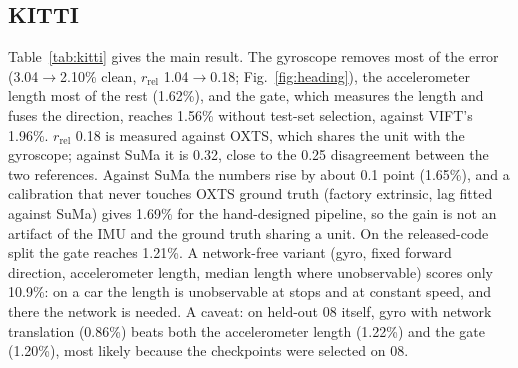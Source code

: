 \documentclass[letterpaper,journal]{IEEEtran}
\begin{document}
\subsection{KITTI}

\begin{table}[t]
\caption{KITTI 05/07/10, $t_\mathrm{rel}$\,\% (mean $\pm$ sd over 3 seeds) / $r_\mathrm{rel}$. Clean: paper-text split, checkpoint selected on held-out 08. With 08: checkpoint selected on the test drives, as in VIFT's code. SuMa: lidar-SLAM reference independent of the IMU; against SuMa, $r_\mathrm{rel}$ is 0.32 for every row with gyro rotation.}
\label{tab:kitti}
\centering\small
\setlength{\tabcolsep}{3pt}
\end{table}

Table~\ref{tab:kitti} gives the main result. The gyroscope removes most of the error (3.04$\to$2.10\% clean, $r_\mathrm{rel}$ 1.04$\to$0.18; Fig.~\ref{fig:heading}), the accelerometer length most of the rest (1.62\%), and the gate, which measures the length and fuses the direction, reaches 1.56\% without test-set selection, against VIFT's 1.96\%. $r_\mathrm{rel}$ 0.18 is measured against OXTS, which shares the unit with the gyroscope; against SuMa it is 0.32, close to the 0.25 disagreement between the two references. Against SuMa the numbers rise by about 0.1 point (1.65\%), and a calibration that never touches OXTS ground truth (factory extrinsic, lag fitted against SuMa) gives 1.69\% for the hand-designed pipeline, so the gain is not an artifact of the IMU and the ground truth sharing a unit. On the released-code split the gate reaches 1.21\%. A network-free variant (gyro, fixed forward direction, accelerometer length, median length where unobservable) scores only 10.9\%: on a car the length is unobservable at stops and at constant speed, and there the network is needed. A caveat: on held-out 08 itself, gyro with network translation (0.86\%) beats both the accelerometer length (1.22\%) and the gate (1.20\%), most likely because the checkpoints were selected on 08.
\end{document}
